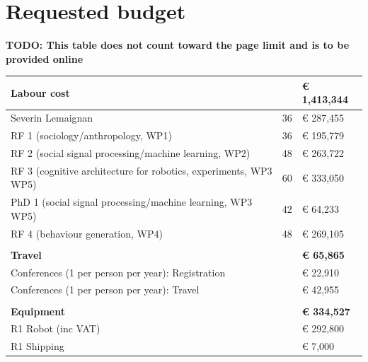 \documentclass[11pt,a4paper]{report}
\newcommand{\TODO}[1]{{\color{red}\textbf{TODO: #1}}}
\newcommand{\eu}[1]{}
\begin{document}
\eu{Has to be provided online; 8000 chars max (eg 2 pages)}


\section{Requested budget}

\TODO{This table does not count toward the page limit and is to be provided online}
\begin{table}[]
\begin{tabular}{@{}lll@{}}
\toprule
\textbf{Labour cost}                                             & \textbf{} & \textbf{€ 1,413,344} \\ \midrule
Severin Lemaignan                                                & 36        & € 287,455            \\
RF 1 (sociology/anthropology, WP1)                               & 36        & € 195,779            \\
RF 2 (social signal processing/machine learning, WP2)            & 48        & € 263,722            \\
RF 3 (cognitive architecture for robotics, experiments, WP3 WP5) & 60        & € 333,050            \\
PhD 1 (social signal processing/machine learning, WP3 WP5)       & 42        & € 64,233             \\
RF 4 (behaviour generation, WP4)                                 & 48        & € 269,105            \\
                                                                 &           &                      \\
\textbf{Travel}                                                  & \textbf{} & \textbf{€ 65,865}    \\ \midrule
Conferences (1 per person per year): Registration                &           & € 22,910             \\
Conferences (1 per person per year): Travel                      &           & € 42,955             \\
                                                                 &           &                      \\
\textbf{Equipment}                                               & \textbf{} & \textbf{€ 334,527}   \\ \midrule
R1 Robot (inc VAT)                                               &           & € 292,800            \\
R1 Shipping                                                      &           & € 7,000              \\

\end{tabular}
\end{table}
\end{document}

